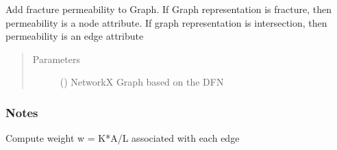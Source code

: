 \documentclass[letterpaper,10pt,english]{sphinxmanual}
\begin{document}

\begin{fulllineitems}
\label{\detokenize{pydfnworks:pydfnworks.dfnGraph.dfn2graph.add_perm}}
Add fracture permeability to Graph. If Graph representation is
fracture, then permeability is a node attribute. If graph representation
is intersection, then permeability is an edge attribute
\begin{quote}\begin{description}
\item[{Parameters}] \leavevmode
{} () \textendash{} NetworkX Graph based on the DFN

\end{description}\end{quote}
\subsubsection*{Notes}

\end{fulllineitems}


\begin{fulllineitems}
\label{\detokenize{pydfnworks:pydfnworks.dfnGraph.dfn2graph.add_weight}}
Compute weight w = K*A/L associated with each edge

\end{fulllineitems}

\end{document}
